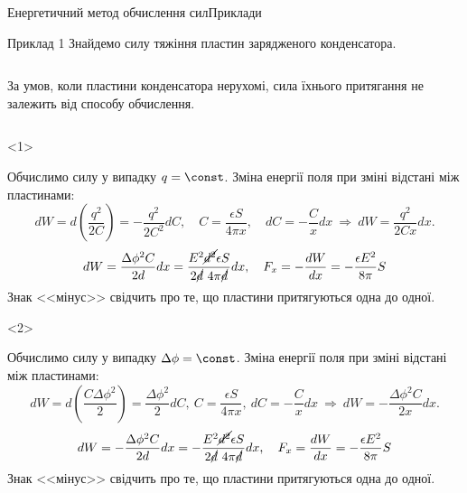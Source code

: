 \documentclass[onlytextwidth]{beamer}
\begin{document}
\begin{frame}{Енергетичний метод обчислення сил}{Приклади}
	\begin{exampleblock}{Приклад 1}\justifying
		Знайдемо силу тяжіння пластин зарядженого конденсатора.
	\end{exampleblock}

	\begin{columns}
		\begin{column}{0.79\linewidth}
			\begin{block}{}\justifying
				За умов, коли пластини конденсатора нерухомі, сила їхнього притягання не залежить
				від способу обчислення.
			\end{block}
		\end{column}
		\begin{column}{0.2\linewidth}\centering
			
		\end{column}
	\end{columns}
	\begin{onlyenv}
		\begin{block}{}\justifying
			Обчислимо силу у випадку $q = \const$.
			Зміна енергії поля при зміні відстані між пластинами:
			\begin{equation*}
				dW = d\left(\frac{q^2}{2C} \right)  = -\frac{q^2}{2C^2} dC, \quad C = \frac{\epsilon
					S}{4\pi
					x}, \quad dC = -\frac{C}{x} dx\ \Rightarrow\ dW = \frac{q^2}{2C x} dx.
			\end{equation*}
			\begin{equation*}
				dW = \frac{\Delta\phi^2 C}{2d} dx = \frac{E^2\cancel{d^2} \epsilon S}{2\cancel{d}\ 4\pi
					\cancel{d}} dx,
				\quad F_x = -\frac{dW}{dx} = -\frac{\epsilon E^2}{8\pi} S
			\end{equation*}
			\alert{\small Знак <<мінус>> свідчить про те, що пластини притягуються одна до одної.}
		\end{block}
	\end{onlyenv}
	\begin{onlyenv}
		\begin{block}{}\justifying
			Обчислимо силу у випадку $\Delta\phi = \const$. Зміна енергії поля при зміні відстані між
			пластинами:
			\begin{equation*}
				dW = d\left(\frac{C \Delta\phi^2}{2} \right)  = \frac{\Delta\phi^2}{2} dC,\ C =
				\frac{\epsilon S}{4\pi
					x},\ dC = -\frac{C}{x} dx\ \Rightarrow\ dW = -\frac{\Delta\phi^2 C}{2x} dx.
			\end{equation*}
			\begin{equation*}
				dW = -\frac{\Delta\phi^2 C}{2d} dx = -\frac{E^2\cancel{d^2} \epsilon
				S}{2\cancel{d}\ 4\pi
					\cancel{d}} dx,
				\quad F_x = \frac{dW}{dx} = -\frac{\epsilon E^2}{8\pi} S
			\end{equation*}
			\alert{\small Знак <<мінус>> свідчить про те, що пластини притягуються одна до одної.}
		\end{block}
	\end{onlyenv}
\end{frame}
\end{document}
